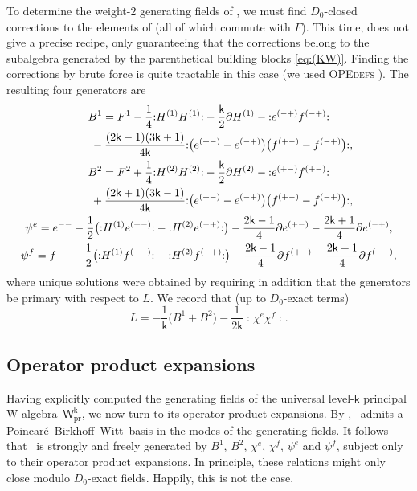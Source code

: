 \documentclass[pdftex]{sigma}
\numberwithin{equation}{section}
\newcommand{\pd}{\partial} %
\newcommand{\kk}{\mathsf{k}} %
\DeclarePairedDelimiter{\brac}{\lparen}{\rparen} %
\newcommand{\no}[1]{\mathopen{:} #1 \mathclose{:}} %
\newcommand{\alg}[1]{\mathfrak{#1}} %
\newcommand{\VOA}[1]{\mathsf{#1}} %
\newcommand{\SLSA}[3]{\alg{#1}_{#2 \vert #3}} %
\newcommand{\psl}{\SLSA{psl}{2}{2}}
\newcommand{\uwalg}[2]{\VOA{W}^{#1}_{\mathrm{#2}}} %
\newcommand{\upr}[1][\kk]{\uwalg{#1}{pr}} %
\newcommand{\pbw}{Poincar\'{e}--Birkhoff--Witt}
\newcommand{\ope}{operator product expansion}
\newcommand{\opes}{\ope s}
\begin{document}
To determine the weight-$2$ generating fields of \smash{$\upr$}, we must find $D_0$-closed corrections to the elements of \smash{$\psl^{(-2)}$} (all of which commute with $F$).
This time, \cite{KacQua03b} does not give a precise recipe, only guaranteeing that the corrections belong to the subalgebra generated by the parenthetical building blocks \eqref{eq:(KW)}.
Finding the corrections by brute force is quite tractable in this case (we used \textsc{OPEdefs} \cite{ThiOPE91}).
The resulting four generators are
\begin{gather*}
		B^1 = F^1 - \frac{1}{4} \no{H^{(1)}H^{(1)}} - \frac{\kk}{2} \pd H^{(1)} - \no{e^{(-+)}f^{(-+)}}
		\\
\phantom{B^1 =}{}	- \frac{(2\kk-1)(3\kk+1)}{4\kk} \no{\big(e^{(+-)}-e^{(-+)}\big) \big(f^{(+-)}-f^{(-+)}\big)}, \\
		B^2 = F^2 + \frac{1}{4} \no{H^{(2)}H^{(2)}} - \frac{\kk}{2} \pd H^{(2)} - \no{e^{(+-)}f^{(+-)}}
			\\
\phantom{B^2 =}{}+ \frac{(2\kk+1)(3\kk-1)}{4\kk} \no{\big(e^{(+-)}-e^{(-+)}\big) \big(f^{(+-)}-f^{(-+)}\big)}, \\
		\psi^e = e^{--} - \frac{1}{2} \brac[\big]{\no{H^{(1)}e^{(+-)}} - \no{H^{(2)}e^{(-+)}}} - \frac{2\kk-1}{4} \pd e^{(+-)} - \frac{2\kk+1}{4} \pd e^{(-+)}, \\
		\psi^f = f^{--} - \frac{1}{2} \brac[\big]{\no{H^{(1)}f^{(+-)}} - \no{H^{(2)}f^{(-+)}}} - \frac{2\kk-1}{4} \pd f^{(+-)} - \frac{2\kk+1}{4} \pd f^{(-+)},
\end{gather*}
where unique solutions were obtained by requiring in addition that the generators be primary with respect to $L$.
We record that (up to $D_0$-exact terms)
\[
	L = -\frac{1}{\kk} \big(B^1+B^2\big) - \frac{1}{2\kk} \no{\chi^e\chi^f}.
\]

\subsection{Operator product expansions} \label{sec:opes}

Having explicitly computed the generating fields of the universal level-$\kk$ principal W-algebra~$\upr$, we now turn to its \opes.
By \cite[Theorem~4.1 and Remark~4.2]{KacQua03b}, \smash{$\upr$}~admits a \pbw\ basis in the modes of the generating fields.
It follows that~\smash{$\upr$} is strongly and freely generated by $B^1$, $B^2$, $\chi^e$, $\chi^f$, $\psi^e$ and $\psi^f$, subject only to their \opes.
In principle, these relations might only close modulo $D_0$-exact fields.
Happily, this is not the case.
\end{document}
